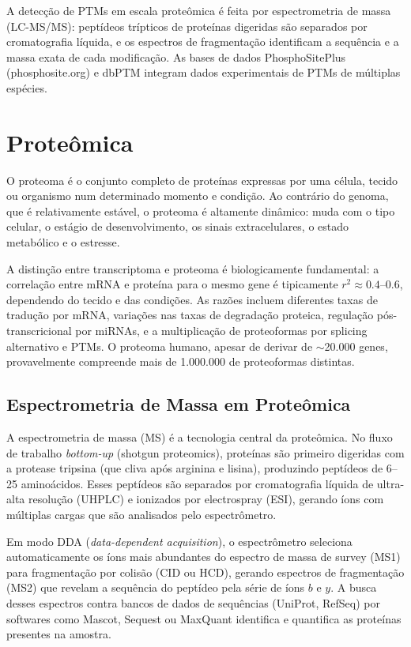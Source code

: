 A detecção de PTMs em escala proteômica é feita por espectrometria de massa (LC-MS/MS):
peptídeos trípticos de proteínas digeridas são separados por cromatografia líquida, e os
espectros de fragmentação identificam a sequência e a massa exata de cada modificação.
As bases de dados PhosphoSitePlus (phosphosite.org) e dbPTM integram dados experimentais
de PTMs de múltiplas espécies.


\section{Proteômica}

\begin{definicaoenv}[Proteoma]
O proteoma é o conjunto completo de proteínas expressas por uma célula, tecido ou
organismo num determinado momento e condição. Ao contrário do genoma, que é relativamente
estável, o proteoma é altamente dinâmico: muda com o tipo celular, o estágio de
desenvolvimento, os sinais extracelulares, o estado metabólico e o estresse.
\end{definicaoenv}

A distinção entre transcriptoma e proteoma é biologicamente fundamental: a correlação entre
mRNA e proteína para o mesmo gene é tipicamente $r^2 \approx 0.4$--$0.6$, dependendo do
tecido e das condições. As razões incluem diferentes taxas de tradução por mRNA, variações
nas taxas de degradação proteica, regulação pós-transcricional por miRNAs, e a multiplicação
de proteoformas por splicing alternativo e PTMs. O proteoma humano, apesar de derivar de
$\sim$20.000 genes, provavelmente compreende mais de 1.000.000 de proteoformas distintas.

\subsection{Espectrometria de Massa em Proteômica}

A espectrometria de massa (MS) é a tecnologia central da proteômica. No fluxo de trabalho
\emph{bottom-up} (shotgun proteomics), proteínas são primeiro digeridas com a protease
tripsina (que cliva após arginina e lisina), produzindo peptídeos de 6--25 aminoácidos.
Esses peptídeos são separados por cromatografia líquida de ultra-alta resolução (UHPLC)
e ionizados por electrospray (ESI), gerando íons com múltiplas cargas que são analisados
pelo espectrômetro.

Em modo DDA (\textit{data-dependent acquisition}), o espectrômetro seleciona automaticamente
os íons mais abundantes do espectro de massa de survey (MS1) para fragmentação por colisão
(CID ou HCD), gerando espectros de fragmentação (MS2) que revelam a sequência do peptídeo
pela série de íons $b$ e $y$. A busca desses espectros contra bancos de dados de sequências
(UniProt, RefSeq) por softwares como Mascot, Sequest ou MaxQuant identifica e quantifica as
proteínas presentes na amostra.

